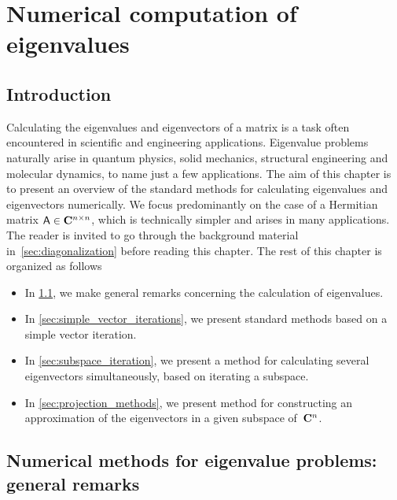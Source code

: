 \chapter{Numerical computation of eigenvalues}%
\label{cha:numerical_computation_of_eigenvalues}
\minitoc

\section*{Introduction}

Calculating the eigenvalues and eigenvectors of a matrix is a task often encountered in scientific and engineering applications.
Eigenvalue problems naturally arise in quantum physics,
solid mechanics, structural engineering and molecular dynamics,
to name just a few applications.
The aim of this chapter is to present an overview of the standard methods for calculating eigenvalues and eigenvectors numerically.
We focus predominantly on the case of a Hermitian matrix $\mathsf A \in \mathbf C^{n \times n}$,
which is technically simpler and arises in many applications.
The reader is invited to go through the background material in~\cref{sec:diagonalization} before reading this chapter.
The rest of this chapter is organized as follows
\begin{itemize}
    \item
        In \cref{sec:general_remarks},
        we make general remarks concerning the calculation of eigenvalues.

    \item
        In \cref{sec:simple_vector_iterations},
        we present standard methods based on a simple vector iteration.

    \item
        In \cref{sec:subspace_iteration},
        we present a method for calculating several eigenvectors simultaneously,
        based on iterating a subspace.

    \item
        In \cref{sec:projection_methods},
        we present method for constructing an approximation of the eigenvectors in a given subspace of~$\mathbf C^{n}$.
\end{itemize}

\section{Numerical methods for eigenvalue problems: general remarks}
\label{sec:general_remarks}

